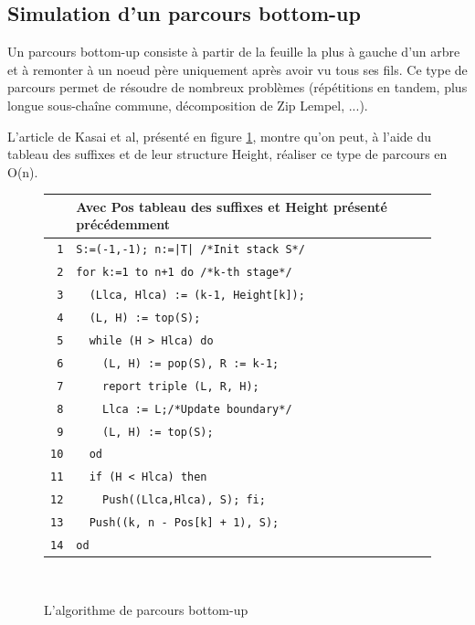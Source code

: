 \documentclass[a4paper,10pt]{article}
\begin{document}
\subsection{Simulation d'un parcours bottom-up}
\label{sec:bottomup}

Un parcours bottom-up consiste à partir de la feuille la plus à gauche
d'un arbre et à remonter à un noeud père uniquement après avoir vu
tous ses fils. Ce type de parcours permet de résoudre de nombreux
problèmes (répétitions en tandem, plus longue sous-chaîne commune,
décomposition de Zip Lempel, ...)\cite{Abouelhoda200453}.

L'article de Kasai et al, présenté en figure \ref{fig:bottomupalgo},
montre qu'on peut, à l'aide du tableau des suffixes et de leur
structure Height, réaliser ce type de parcours en O(n).


\begin{figure}
  \centering
        \begin{tabular}{r|l}
         & Avec Pos tableau des suffixes et Height présenté
         précédemment\\
         \hline
        \texttt{1}  & \verb!S:=(-1,-1); n:=|T| /*Init stack S*/!\\
        \texttt{2}  & \verb!for k:=1 to n+1 do /*k-th stage*/!\\
        \texttt{3}  & \verb!  (Llca, Hlca) := (k-1, Height[k]);!\\
        \texttt{4}  & \verb!  (L, H) := top(S);!\\
        \texttt{5}  & \verb!  while (H > Hlca) do!\\
        \texttt{6}  & \verb!    (L, H) := pop(S), R := k-1;!\\
        \texttt{7}  & \verb!    report triple (L, R, H);!\\
        \texttt{8}  & \verb!    Llca := L;/*Update boundary*/!\\
        \texttt{9}  & \verb!    (L, H) := top(S);!\\
        \texttt{10} & \verb!  od!\\
        \texttt{11} & \verb!  if (H < Hlca) then!\\
        \texttt{12} & \verb!    Push((Llca,Hlca), S); fi;!\\
        \texttt{13} & \verb!  Push((k, n - Pos[k] + 1), S);!\\
        \texttt{14} & \verb!od!\\
      \end{tabular}\\
  \caption{L'algorithme de parcours bottom-up}
  \label{fig:bottomupalgo}
\end{figure}
\end{document}
